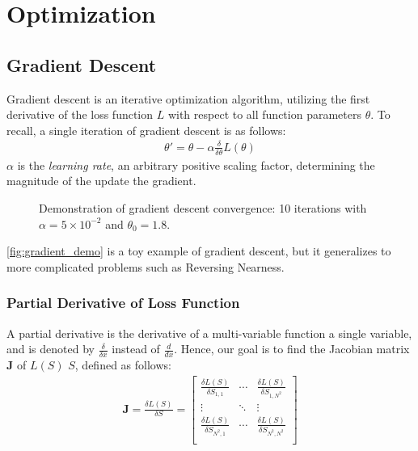 \section{Optimization}%
\label{sec:optimization}

\subsection{Gradient Descent}%
\label{sub:gradient_descent}
Gradient descent is an iterative optimization algorithm, utilizing the first derivative of the loss function $L$ with respect to all function parameters $\theta$. To recall, a single iteration of gradient descent is as follows:
\begin{align}
         \theta'=\theta-\alpha \frac{\delta}{\delta \theta}L(\theta)
\end{align}
$\alpha$ is the \emph{learning rate}, an arbitrary positive scaling factor, determining the magnitude of the update \wrt{} the gradient.

\begin{figure}[htpb]
        \centering
        
        \caption{Demonstration of gradient descent convergence: 10 iterations with $\alpha =5\times 10^{-2}$ and $\theta_0=1.8$.}
        \label{fig:gradient_demo}
\end{figure}

\autoref{fig:gradient_demo} is a toy example of gradient descent, but it generalizes to more complicated problems such as Reversing Nearness.

\subsubsection{Partial Derivative of Loss Function}%
\label{ssub:derivative_of_loss_function}
A partial derivative is the derivative of a multi-variable function \wrt{} a single variable, and is denoted by $\frac{\delta}{\delta x}$ instead of $\frac{d}{dx}$. Hence, our goal is to find the Jacobian matrix $\bm{J}$ of $L(S)$ \wrt{} $S$, defined as follows:
 \begin{align}
     \bm{J}=\frac{\delta L(S)}{\delta S}= \begin{bmatrix}
                 \frac{\delta L(S)}{\delta S_{1,1}}&\cdots &\frac{\delta L(S)}{\delta S_{1,N^2}}\\
                 \vdots &\ddots &\vdots \\
                 \frac{\delta L(S)}{\delta S_{N^2,1}}&\cdots &\frac{\delta L(S)}{\delta S_{N^2,N^2}}\\
         \end{bmatrix}
         \label{eq:jacobian_definition}
\end{align}

